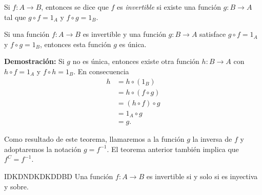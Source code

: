 \newpage

\begin{definicion}{}{}
    Si $f:A \longrightarrow B$, entonces se dice que $f$ es \textit{invertible} si existe una función $g: B \longrightarrow A$ tal que $g \circ f = 1_A$ y $f \circ g = 1_B$.
\end{definicion}

\begin{theorem}{}{}
    Si una función $f:A \longrightarrow B$ es invertible y una función $g:B \longrightarrow A$ satisface $g \circ f = 1_A$ y $f \circ g = 1_B$, entonces esta función $g$ es única.

    \tcblower
    \textbf{\color{jblueleft}Demostración:} Si $g$ no es única, entonces existe otra función $h:B \longrightarrow A$ con $h \circ f = 1_A$ y $f \circ h = 1_B$. En consecuencia
    \begin{align*}
        h & = h \circ (1_B) \\
        & = h \circ (f \circ g) \\
        & = (h \circ f) \circ g \\
        & = 1_A \circ g \\
        & = g.
    \end{align*}
\end{theorem}

\begin{notation*}{}
    Como resultado de este teorema, llamaremos a la función $g$ la inversa de $f$ y adoptaremos la notación $g = f^{-1}$. El teorema anterior también implica que $f^C = f^{-1}$.
\end{notation*}

\begin{theorem}{}{IDKDNDKDKDDBD}
    Una función $f:A \longrightarrow B$ es invertible si y solo si es inyectiva y sobre.
\end{theorem}

